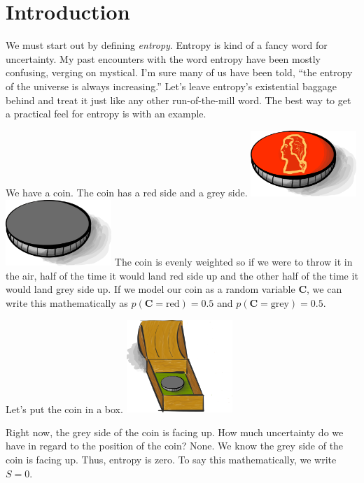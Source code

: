 \section{Introduction}

We must start out by defining \textit{entropy}.
Entropy is kind of a fancy word for uncertainty.
My past encounters with the word entropy have been mostly confusing, verging on mystical.
I'm sure many of us have been told, ``the entropy of the universe is always increasing.''
Let's leave entropy's existential baggage behind and treat it just like any other run-of-the-mill word.
The best way to get a practical feel for entropy is with an example.

We have a coin.
The coin has a red side and a grey side.
\includegraphics[width=0.3\textwidth]{img/red-coin}
\includegraphics[width=0.3\textwidth]{img/grey-coin}
The coin is evenly weighted so if we were to throw it in the air, half of the time it would land red side up and the other half of the time it would land grey side up.
If we model our coin as a random variable $\bm{C}$, we can write this mathematically as $p(\bm{C} = \text{red}) = 0.5$ and $p(\bm{C} = \text{grey}) = 0.5$.

Let's put the coin in a box.
\includegraphics[width=0.3\textwidth]{img/big-box-open-coin}

Right now, the grey side of the coin is facing up.
How much uncertainty do we have in regard to the position of the coin?
None.
We know the grey side of the coin is facing up.
Thus, entropy is zero.
To say this mathematically, we write $S = 0$.

